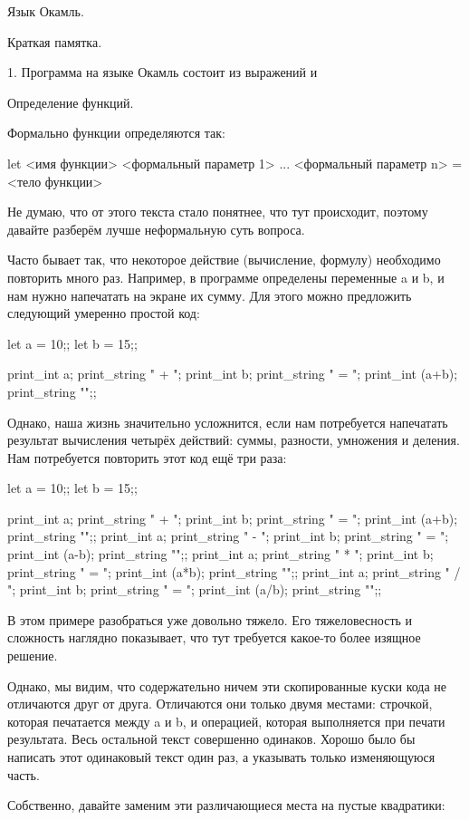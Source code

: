 Язык Окамль. 

Краткая памятка.

1. Программа на языке Окамль состоит из выражений и 


Определение функций.

Формально функции определяются так:

let <имя функции> <формальный параметр 1> ... <формальный параметр n> = <тело функции>

Не думаю, что от этого текста стало понятнее, что тут происходит, поэтому давайте 
разберём лучше неформальную суть вопроса.

Часто бывает так, что некоторое действие (вычисление, формулу) необходимо повторить
много раз. Например, в программе определены переменные a и b, и нам нужно напечатать 
на экране их сумму. Для этого можно предложить следующий умеренно простой код:

let a = 10;; let b = 15;;

print_int a; print_string " + "; print_int b; 
print_string " = "; print_int (a+b); print_string "\n";;

Однако, наша жизнь значительно усложнится, если нам потребуется напечатать результат
вычисления четырёх действий: суммы, разности, умножения и деления. Нам потребуется
повторить этот код ещё три раза:

let a = 10;; let b = 15;;

print_int a; print_string " + "; print_int b; 
print_string " = "; print_int (a+b); print_string "\n";;
print_int a; print_string " - "; print_int b; 
print_string " = "; print_int (a-b); print_string "\n";;
print_int a; print_string " * "; print_int b; 
print_string " = "; print_int (a*b); print_string "\n";;
print_int a; print_string " / "; print_int b; 
print_string " = "; print_int (a/b); print_string "\n";;

В этом примере разобраться уже довольно тяжело. Его тяжеловесность и сложность
наглядно показывает, что тут требуется какое-то более изящное решение.

Однако, мы видим, что содержательно ничем эти скопированные куски кода не 
отличаются друг от друга. Отличаются они только двумя местами: 
строчкой, которая печатается между a и b, и операцией, которая выполняется 
при печати результата. Весь остальной текст совершенно одинаков.
Хорошо было бы написать этот одинаковый текст один раз, а указывать только 
изменяющуюся часть.

Собственно, давайте заменим эти различающиеся места на пустые квадратики:

